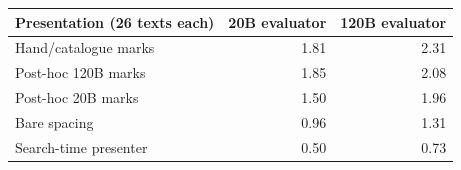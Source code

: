 \begin{center}\small
\begin{tabular}{lrr}\toprule
Presentation (26 texts each) & 20B evaluator & 120B evaluator \\\midrule
Hand/catalogue marks & 1.81 & 2.31 \\
Post-hoc 120B marks & 1.85 & 2.08 \\
Post-hoc 20B marks & 1.50 & 1.96 \\
Bare spacing & 0.96 & 1.31 \\
Search-time presenter & 0.50 & 0.73 \\
\bottomrule\end{tabular}
\end{center}
